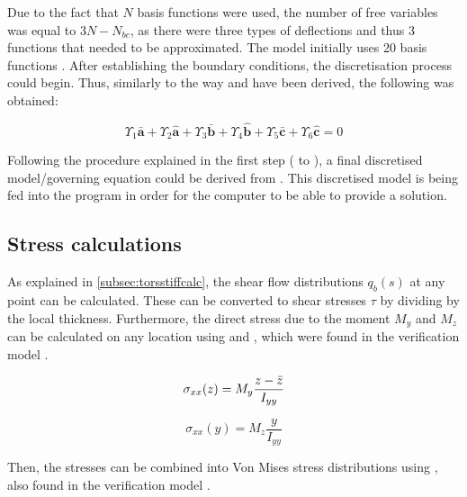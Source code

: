 \noindent Due to the fact that $N$ basis functions were used, the number of free variables was equal to $3N- N_{bc}$, as there were three types of deflections and thus 3 functions that needed to be approximated. The model initially uses 20 basis functions \cite{Verification_model_description}. After establishing the boundary conditions, the discretisation process could begin. Thus, similarly to the way  and  have been derived, the following was obtained:

\begin{equation}
    \label{eq:new_form_of_BC_final}
    \Upsilon_{1} \mathbf{\bar{a}}+\Upsilon_{2} \mathbf{\hat{a}}+\Upsilon_{3} \mathbf{\bar{b}}+\Upsilon_{4} \mathbf{\hat{b}}+\Upsilon_{5} \mathbf{\bar{c}}+\Upsilon_{6} \mathbf{\hat{c}}=0
\end{equation}

\noindent Following the procedure explained in the first step ( to ), a final discretised model/governing equation could be derived from . This discretised model is being fed into the program in order for the computer to be able to provide a solution.  

\subsection{Stress calculations}
As explained in \autoref{subsec:torsstiffcalc}, the shear flow distributions $q_b(s)$ at any point can be calculated. These can be converted to shear stresses $\tau$ by dividing by the local thickness. 
Furthermore, the direct stress due to the moment $M_y$ and $M_z$ can be calculated on any location using  and , which were found in the verification model \cite{Verification_model_description}.

\begin{equation} \label{eq:sigma_xxz}
    \sigma_{xx}(z) = M_y \frac{z - \Bar{z}}{I_{yy}}
\end{equation}

\begin{equation} \label{eq:sigma_xxy}
    \sigma_{xx}(y) = M_z \frac{y}{I_{yy}}
\end{equation}

\noindent Then, the stresses can be combined into Von Mises stress distributions using , also found in the verification model \cite{Verification_model_description}.

